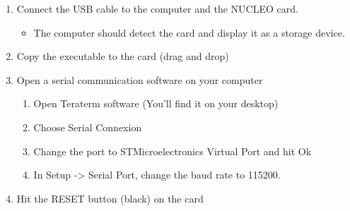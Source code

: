\begin{UPSTIactivite}
\begin{enumerate}
  \item Connect the USB cable to the computer and the NUCLEO card.
        \begin{itemize}
         \item The computer should detect the card and display it as a storage device.
        \end{itemize}
  \item Copy the executable to the card (drag and drop)
  \item Open a serial communication software on your computer
        \begin{enumerate}
         \item Open Teraterm software (You'll find it on your desktop)
         \item Choose Serial Connexion
         \item Change the port to STMicroelectronics Virtual Port and hit Ok
         \item In Setup -> Serial Port, change the baud rate to \num{115200}.
        \end{enumerate}
  \item Hit the RESET button (black) on the card
 \end{enumerate}
\end{UPSTIactivite}
